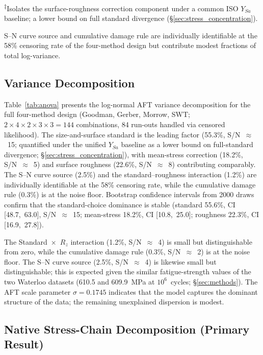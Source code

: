 \documentclass[twocolumn,12pt,a4paper]{article}
\begin{document}
\begin{table}[h]
\medskip\noindent\textsuperscript{$\ddagger$}Isolates the surface-roughness
correction component under a common ISO $Y_{Sa}$ baseline; a lower bound on
full standard divergence (\S\ref{sec:stress_concentration}).

\noindent S--N curve source and cumulative damage rule are individually
identifiable at the 58\% censoring rate of the four-method design but
contribute modest fractions of total log-variance.
\end{table}

\subsection{Variance Decomposition}

Table~\ref{tab:anova} presents the log-normal AFT variance
decomposition for the full four-method design (Goodman, Gerber,
Morrow, SWT; $2\times4\times2\times3\times3=144$ combinations,
84 run-outs handled via censored likelihood). The size-and-surface
standard is the leading factor (55.3\%, S/N~$\approx$~15; quantified
under the unified $Y_{Sa}$ baseline as a lower bound on full-standard
divergence; \S\ref{sec:stress_concentration}), with mean-stress
correction (18.2\%, S/N~$\approx$~5) and surface roughness (22.6\%,
S/N~$\approx$~8) contributing comparably. The S--N curve source
(2.5\%) and the standard--roughness interaction (1.2\%) are
individually identifiable at the 58\% censoring rate, while the
cumulative damage rule (0.3\%) is at the noise floor. Bootstrap
confidence intervals from 2000 draws confirm that the
standard-choice dominance is stable (standard 55.6\%, CI
[48.7,~63.0], S/N~$\approx$~15; mean-stress 18.2\%, CI
[10.8,~25.0]; roughness 22.3\%, CI [16.9,~27.8]).

The Standard~$\times$~$R_z$ interaction (1.2\%, S/N~$\approx$~4) is
small but distinguishable from zero, while the cumulative damage rule
(0.3\%, S/N~$\approx$~2) is at the noise floor. The S--N curve source
(2.5\%, S/N~$\approx$~4) is likewise small but distinguishable; this
is expected given the similar fatigue-strength values of the two
Waterloo datasets (610.5 and 609.9~MPa at $10^6$~cycles;
\S\ref{sec:methods}). The
AFT scale parameter $\sigma = 0.1745$ indicates that the model
captures the dominant structure of the data; the remaining
unexplained dispersion is modest.

\subsection{Native Stress-Chain Decomposition (Primary Result)}
\label{sec:native_chain}
\end{document}
